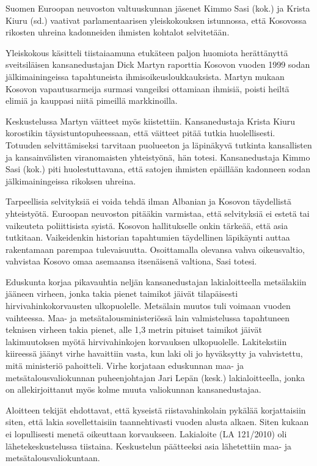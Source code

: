 Suomen Euroopan neuvoston valtuuskunnan jäsenet Kimmo Sasi (kok.) ja
Krista Kiuru (sd.) vaativat parlamentaarisen yleiskokouksen
istunnossa, että Kosovossa rikosten uhreina kadonneiden ihmisten
kohtalot selvitetään.

Yleiskokous käsitteli tiistaiaamuna etukäteen paljon huomiota
herättänyttä sveitsiläisen kansanedustajan Dick Martyn raporttia
Kosovon vuoden 1999 sodan jälkimainingeissa tapahtuneista
ihmisoikeusloukkauksista. Martyn mukaan Kosovon vapautusarmeija
surmasi vangeiksi ottamiaan ihmisiä, poisti heiltä elimiä ja kauppasi
niitä pimeillä markkinoilla.

Keskustelussa Martyn väitteet myös kiistettiin. Kansanedustaja Krista
Kiuru korostikin täysistuntopuheessaan, että väitteet pitää tutkia
huolellisesti.  Totuuden selvittämiseksi tarvitaan puolueeton ja
läpinäkyvä tutkinta kansallisten ja kansainvälisten viranomaisten
yhteistyönä, hän totesi.  Kansanedustaja Kimmo Sasi (kok.) piti
huolestuttavana, että satojen ihmisten epäillään kadonneen sodan
jälkimainingeissa rikoksen uhreina.

Tarpeellisia selvityksiä ei voida tehdä ilman Albanian ja Kosovon
täydellistä yhteistyötä. Euroopan neuvoston pitääkin varmistaa, että
selvityksiä ei estetä tai vaikeuteta poliittisista syistä. Kosovon
hallitukselle onkin tärkeää, että asia tutkitaan. Vaikeidenkin
historian tapahtumien täydellinen läpikäynti auttaa rakentamaan
parempaa tulevaisuutta. Osoittamalla olevansa vahva oikeusvaltio,
vahvistaa Kosovo omaa asemaansa itsenäisenä valtiona, Sasi totesi.

Eduskunta korjaa pikavauhtia neljän kansanedustajan lakialoitteella
metsälakiin jääneen virheen, jonka takia pienet taimikot jäivät
tilapäisesti hirvivahinkokorvausten ulkopuolelle.  Metsälain muutos
tuli voimaan vuoden vaihteessa. Maa- ja metsätalousministeriössä lain
valmistelussa tapahtuneen teknisen virheen takia pienet, alle 1,3
metrin pituiset taimikot jäivät lakimuutoksen myötä hirvivahinkojen
korvauksen ulkopuolelle.  Lakitekstiin kiireessä jäänyt virhe
havaittiin vasta, kun laki oli jo hyväksytty ja vahvistettu, mitä
ministeriö pahoitteli. Virhe korjataan eduskunnan maa- ja
metsätalousvaliokunnan puheenjohtajan Jari Lepän (kesk.)
lakialoitteella, jonka on allekirjoittanut myös kolme muuta
valiokunnan kansanedustajaa.

Aloitteen tekijät ehdottavat, että kyseistä riistavahinkolain pykälää
korjattaisiin siten, että lakia sovellettaisiin taannehtivasti vuoden
alusta alkaen. Siten kukaan ei lopullisesti menetä oikeuttaan
korvaukseen.  Lakialoite (LA 121/2010) oli lähetekeskustelussa
tiistaina. Keskustelun päätteeksi asia lähetettiin maa- ja
metsätalousvaliokuntaan.

